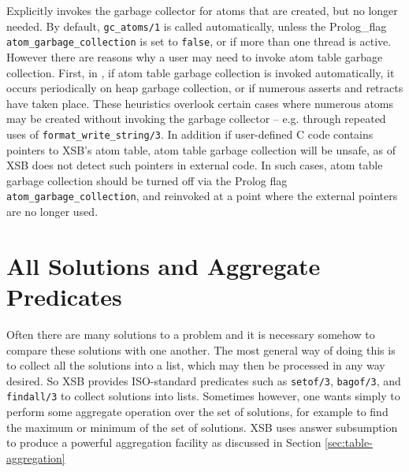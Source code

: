 \begin{description}
%
Explicitly invokes the garbage collector for atoms that are created,
but no longer needed.  By default, {\tt gc\_atoms/1} is called
automatically, unless the Prolog\_flag {\tt atom\_garbage\_collection}
is set to {\tt false}, or if more than one thread is active.  However
there are reasons why a user may need to invoke atom table garbage
collection.  First, in \version{}, if atom table garbage collection is
invoked automatically, it occurs periodically on heap garbage
collection, or if numerous asserts and retracts have taken place.
These heuristics overlook certain cases where numerous atoms may be
created without invoking the garbage collector -- e.g. through
repeated uses of {\tt format\_write\_string/3}.  In addition if
user-defined C code contains pointers to XSB's atom table, atom table
garbage collection will be unsafe, as \version{} of XSB does not
detect such pointers in external code.  In such cases, atom table
garbage collection should be turned off via the Prolog flag {\tt
  atom\_garbage\_collection}, and reinvoked at a point where the
external pointers are no longer used.

\end{description}


\section{All Solutions and Aggregate Predicates}
 
Often there are many solutions to a problem and it is necessary
somehow to compare these solutions with one another.  The most general
way of doing this is to collect all the solutions into a list, which
may then be processed in any way desired.  So XSB provides
ISO-standard predicates such as {\tt setof/3}, {\tt bagof/3}, and {\tt
findall/3} to collect solutions into lists.  Sometimes however, one
wants simply to perform some aggregate operation over the set of
solutions, for example to find the maximum or minimum of the set of
solutions.  XSB uses answer subsumption to produce a 
powerful aggregation facility as discussed in Section
\ref{sec:table-aggregation}

